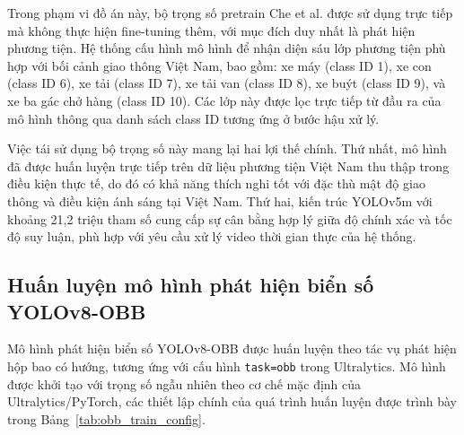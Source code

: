 \documentclass[../DoAn.tex]{subfiles}
\begin{document}
Trong phạm vi đồ án này, bộ trọng số pretrain Che et al. được sử dụng trực tiếp mà không thực hiện fine-tuning thêm, với mục đích duy nhất là phát hiện phương tiện. Hệ thống cấu hình mô hình để nhận diện sáu lớp phương tiện phù hợp với bối cảnh giao thông Việt Nam, bao gồm: xe máy (class ID 1), xe con (class ID 6), xe tải (class ID 7), xe tải van (class ID 8), xe buýt (class ID 9), và xe ba gác chở hàng (class ID 10). Các lớp này được lọc trực tiếp từ đầu ra của mô hình thông qua danh sách class ID tương ứng ở bước hậu xử lý.

Việc tái sử dụng bộ trọng số này mang lại hai lợi thế chính. Thứ nhất, mô hình đã được huấn luyện trực tiếp trên dữ liệu phương tiện Việt Nam thu thập trong điều kiện thực tế, do đó có khả năng thích nghi tốt với đặc thù mật độ giao thông và điều kiện ánh sáng tại Việt Nam. Thứ hai, kiến trúc YOLOv5m với khoảng 21,2 triệu tham số cung cấp sự cân bằng hợp lý giữa độ chính xác và tốc độ suy luận, phù hợp với yêu cầu xử lý video thời gian thực của hệ thống.

\subsection{Huấn luyện mô hình phát hiện biển số YOLOv8-OBB}
\label{subsection:4.2.2_obb}

Mô hình phát hiện biển số YOLOv8-OBB được huấn luyện theo tác vụ phát hiện hộp bao có hướng, tương ứng với cấu hình \texttt{task=obb} trong Ultralytics. Mô hình được khởi tạo với trọng số ngẫu nhiên theo cơ chế mặc định của Ultralytics/PyTorch, các thiết lập chính của quá trình huấn luyện được trình bày trong Bảng~\ref{tab:obb_train_config}.
\end{document}
